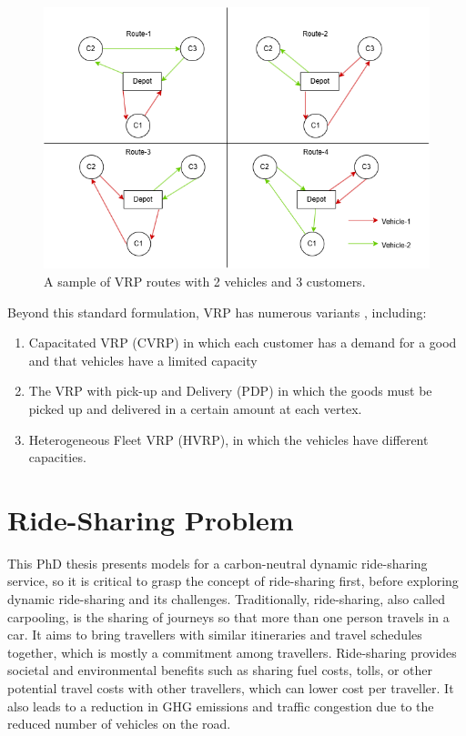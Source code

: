 \begin{figure}[htbp]
    \centering
    \includegraphics[scale=0.6]{Crest/Images/vrp_illustration.png}
    \caption{A sample of VRP routes with 2 vehicles and 3 customers.}
    \label{fig:vrp_illustration}
\end{figure}

Beyond this standard formulation, VRP has numerous variants \cite{vrp_survey}, including:
\begin{enumerate}
    \item Capacitated VRP (CVRP) in which each customer has a demand for a good and that vehicles have a limited capacity
    \item The VRP with pick-up and Delivery (PDP) in which the goods must be picked up and delivered in a certain amount at each vertex.
    \item  Heterogeneous Fleet VRP (HVRP), in which the vehicles have different capacities.
\end{enumerate}


\section{Ride-Sharing Problem}\label{Section22}
This PhD thesis presents models for a carbon-neutral dynamic ride-sharing service, so it is critical to grasp the concept of ride-sharing first, before exploring dynamic ride-sharing and its challenges. Traditionally, ride-sharing, also called carpooling, is the sharing of journeys so that more than one person travels in a car. It aims to bring travellers with similar itineraries and travel schedules together, which is mostly a commitment among travellers. Ride-sharing provides societal and environmental benefits such as sharing fuel costs, tolls, or other potential travel costs with other travellers, which can lower cost per traveller. It also leads to a reduction in GHG emissions and traffic congestion due to the reduced number of vehicles on the road.

